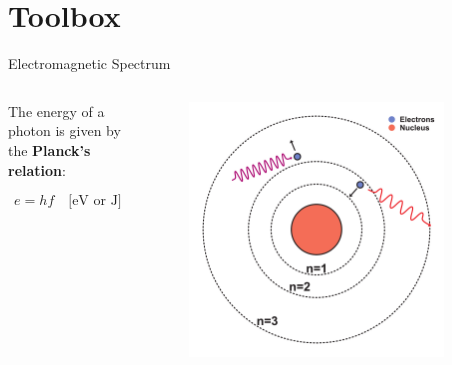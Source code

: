 \section{Toolbox}

\begin{frame}{Electromagnetic Spectrum}

    \begin{columns}[c, onlytextwidth]

        \begin{column}{0.55\textwidth}

            The energy of a photon is given by the \textbf{Planck's relation}\footnotemark[1]:

            \begin{equation}
                e = h f \quad \text{[eV or J]}
            \end{equation}

        \end{column}

        \begin{column}{0.45\textwidth}

            \begin{figure}
                \centering
                \includegraphics[width=0.9\textwidth]{pdf/eletronic-structure.pdf}
            \end{figure}


\end{column}
\end{columns}
\end{frame}
